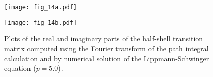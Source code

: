 \documentclass[aps,prc,reprint,noshowpacs,groupedaddress,onecolumn]{revtex4}
\begin{document}
\begin{figure}
\caption{
Plots of the real and imaginary parts of the
half-shell transition
matrix computed using the Fourier transform of the path integral
calculation and by numerical solution of the Lippmann-Schwinger
equation ($p=5.0$).}
\begin{minipage}[t]{.45\linewidth}
\centering
\texttt{[image: fig\_14a.pdf]}
\end{minipage}
\begin{minipage}[t]{.45\linewidth}
\centering
\texttt{[image: fig\_14b.pdf]}
\end{minipage}
\label{figure 14}
\end{figure}
\end{document}
